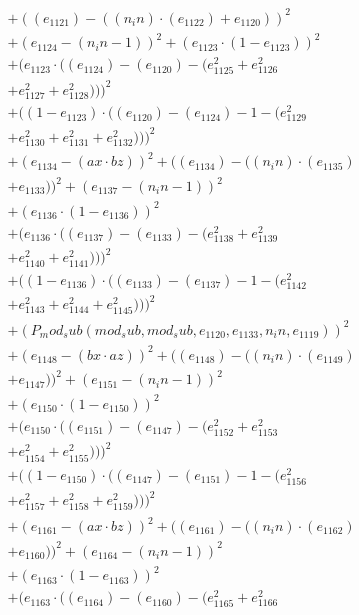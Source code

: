 \documentclass[10pt, a4paper]{article}
\begin{document}
\begin{small}
\begin{align*}
& + ((e_{1121}) - ((n_in)  \cdot  (e_{1122}) + e_{1120}))^{2} \\
& + (e_{1124} - (n_in - 1))^{2} + (e_{1123}  \cdot  (1 - e_{1123}))^{2} \\
& + (e_{1123}  \cdot  ((e_{1124}) - (e_{1120}) - (e_{1125}^{2} + e_{1126}^{2} \\
& + e_{1127}^{2} + e_{1128}^{2})))^{2} \\
& + ((1 - e_{1123})  \cdot  ((e_{1120}) - (e_{1124}) - 1 - (e_{1129}^{2} \\
& + e_{1130}^{2} + e_{1131}^{2} + e_{1132}^{2})))^{2} \\
& + (e_{1134} - (ax  \cdot  bz))^{2} + ((e_{1134}) - ((n_in)  \cdot  (e_{1135}) \\
& + e_{1133}))^{2} + (e_{1137} - (n_in - 1))^{2} \\
& + (e_{1136}  \cdot  (1 - e_{1136}))^{2} \\
& + (e_{1136}  \cdot  ((e_{1137}) - (e_{1133}) - (e_{1138}^{2} + e_{1139}^{2} \\
& + e_{1140}^{2} + e_{1141}^{2})))^{2} \\
& + ((1 - e_{1136})  \cdot  ((e_{1133}) - (e_{1137}) - 1 - (e_{1142}^{2} \\
& + e_{1143}^{2} + e_{1144}^{2} + e_{1145}^{2})))^{2} \\
& + (P_mod_sub(mod_sub, mod_sub, e_{1120}, e_{1133}, n_in, e_{1119}))^{2} \\
& + (e_{1148} - (bx  \cdot  az))^{2} + ((e_{1148}) - ((n_in)  \cdot  (e_{1149}) \\
& + e_{1147}))^{2} + (e_{1151} - (n_in - 1))^{2} \\
& + (e_{1150}  \cdot  (1 - e_{1150}))^{2} \\
& + (e_{1150}  \cdot  ((e_{1151}) - (e_{1147}) - (e_{1152}^{2} + e_{1153}^{2} \\
& + e_{1154}^{2} + e_{1155}^{2})))^{2} \\
& + ((1 - e_{1150})  \cdot  ((e_{1147}) - (e_{1151}) - 1 - (e_{1156}^{2} \\
& + e_{1157}^{2} + e_{1158}^{2} + e_{1159}^{2})))^{2} \\
& + (e_{1161} - (ax  \cdot  bz))^{2} + ((e_{1161}) - ((n_in)  \cdot  (e_{1162}) \\
& + e_{1160}))^{2} + (e_{1164} - (n_in - 1))^{2} \\
& + (e_{1163}  \cdot  (1 - e_{1163}))^{2} \\
& + (e_{1163}  \cdot  ((e_{1164}) - (e_{1160}) - (e_{1165}^{2} + e_{1166}^{2} \\

\end{align*}
\end{small}
\end{document}
